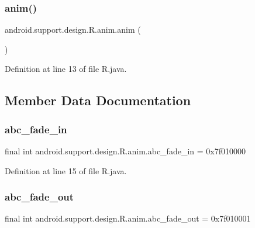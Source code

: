 \subsubsection{\texorpdfstring{anim()}{anim()}}
{\footnotesize\ttfamily android.\+support.\+design.\+R.\+anim.\+anim (\begin{DoxyParamCaption}{ }\end{DoxyParamCaption})\hspace{0.3cm}{\ttfamily [private]}}



Definition at line 13 of file R.\+java.


\begin{DoxyCode}{0}

\end{DoxyCode}


\subsection{Member Data Documentation}
\mbox{\label{classandroid_1_1support_1_1design_1_1_r_1_1anim_ad1aab55327ed71f67234994b071ab794}} 
\subsubsection{\texorpdfstring{abc\_fade\_in}{abc\_fade\_in}}
{\footnotesize\ttfamily final int android.\+support.\+design.\+R.\+anim.\+abc\+\_\+fade\+\_\+in = 0x7f010000\hspace{0.3cm}{\ttfamily [static]}}



Definition at line 15 of file R.\+java.

\mbox{\label{classandroid_1_1support_1_1design_1_1_r_1_1anim_a8773dce408c4627fa162cb820d04f0da}} 
\subsubsection{\texorpdfstring{abc\_fade\_out}{abc\_fade\_out}}
{\footnotesize\ttfamily final int android.\+support.\+design.\+R.\+anim.\+abc\+\_\+fade\+\_\+out = 0x7f010001\hspace{0.3cm}{\ttfamily [static]}}



